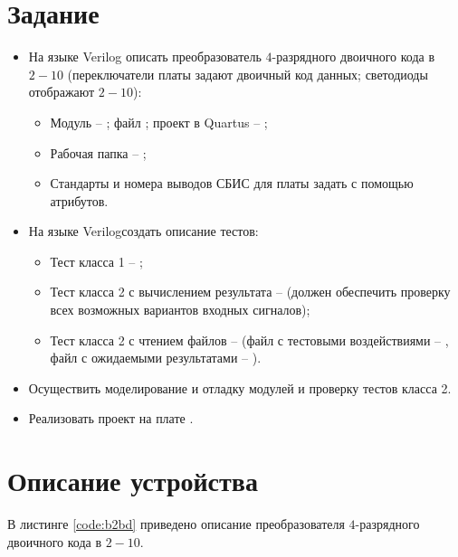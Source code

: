 





\tableofcontents
\lstlistoflistings
\listoffigures
\newpage

\section{Задание}

\begin{itemize}
	\item На языке Verilog описать преобразователь $4$-разрядного двоичного кода в $2-10$ (переключатели платы  задают двоичный код данных; светодиоды отображают $2-10$):
		\begin{itemize}
			\item Модуль -- ; файл ; проект в Quartus -- ;
			\item Рабочая папка -- ;
			\item Стандарты и номера выводов СБИС для платы  задать с помощью атрибутов.
		\end{itemize}
	
	\item На языке Verilogсоздать описание тестов:
		\begin{itemize}
			\item Тест класса 1 -- ;
			\item Тест класса 2 с вычислением результата --  (должен обеспечить проверку всех возможных вариантов входных сигналов);
			\item Тест класса 2 с чтением файлов --  (файл с тестовыми воздействиями -- , файл с ожидаемыми результатами -- ).
		\end{itemize}
	
	\item Осуществить моделирование и отладку модулей и проверку тестов класса 2.
	
	\item Реализовать проект на плате .
\end{itemize}

\section{Описание устройства}

\noindent В листинге \ref{code:b2bd} приведено описание преобразователя $4$-разрядного двоичного кода в $2-10$.


